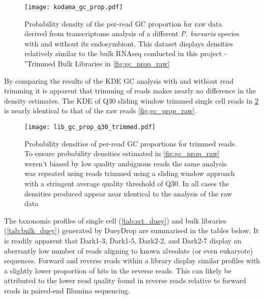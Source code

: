 \begin{figure}[h]
	\centering
    \texttt{[image: kodama\_gc\_prop.pdf]}
    \caption{Probability density of the per-read GC proportion for raw data derived from
    \citep{Kodama2014} transcriptome analysis of a different \textit{P. bursaria} species
with and without its endosymbiont. This dataset displays densities relatively similar
to the bulk RNAseq conducted in this project - "Trimmed Bulk Libraries in \cref{fig:gc_prop_raw}}
    \label{fig:gc_prop_kodama}
\end{figure}

By comparing the results of the KDE GC analysis with and without read trimming it
is apparent that trimming of reads makes nearly no difference in the density estimates.
The KDE of Q30 sliding window trimmed single cell reads in \cref{fig:gc_prop_q30} is nearly
identical to that of the raw reads \cref{fig:gc_prop_raw}.

\begin{figure}[h]
    \texttt{[image: lib\_gc\_prop\_q30\_trimmed.pdf]}
    \caption{Probability densities of per-read GC proportions for trimmed reads.
             To ensure probability densities estimated in \cref{fig:gc_prop_raw}
         weren't biased by low quality ambiguous reads the same analysis was
     repeated using reads trimmed using a sliding window approach with a stringent average
 quality threshold of Q30.  In all cases the densities produced appear near identical to
 the analysis of the raw data}
    \label{fig:gc_prop_q30}
\end{figure}

The taxonomic profiles of single cell (\cref{tab:sct_duey}) and bulk libraries (\cref{tab:bulk_duey}) 
generated by DueyDrop are summarised in the tables below.  It is readily apparent 
that Dark1-3, Dark1-5, Dark2-2, and Dark2-7 display an aberrantly low number of reads
aligning to known alveolate (or even eukaryote) sequences. 
Forward and reverse reads within a library display similar profiles with a slightly
lower proportion of hits in the reverse reads. This can likely be attributed to
the lower read quality found in reverse reads relative to forward reads 
in paired-end Illumina sequencing. 

